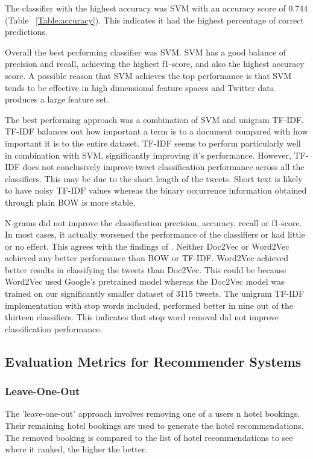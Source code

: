 The classifier with the highest accuracy was SVM with an accuracy score of 0.744 (Table ~\ref{Table:accuracy}). This indicates it had the highest percentage of correct predictions.

Overall the best performing classifier was SVM. SVM has a good balance of precision and recall, achieving the highest f1-score, and also the highest accuracy score. A possible reason that SVM achieves the top performance is that SVM tends to be effective in high dimensional feature spaces and Twitter data produces a large feature set.

The best performing approach was a combination of SVM and unigram TF-IDF. TF-IDF balances out how important a term is to a document compared with how important it is to the entire dataset. TF-IDF seems to perform particularly well in combination with SVM, significantly improving it's performance. However, TF-IDF does not conclusively improve tweet classification performance across all the classifiers. This may be due to the short length of the tweets. Short text is likely to have noisy TF-IDF values whereas the binary occurrence information obtained through plain BOW is more stable.

N-grams did not improve the classification precision, accuracy, recall or f1-score. In most cases, it actually worsened the performance of the classifiers or had little or no effect. This agrees with the findings of \cite{Berm2010}. Neither Doc2Vec or Word2Vec achieved any better performance than BOW or TF-IDF. Word2Vec achieved better results in classifying the tweets than Doc2Vec. This could be because Word2Vec used Google's pretrained model whereas the Doc2Vec model was trained on our significantly smaller dataset of 3115 tweets. The unigram TF-IDF implementation with stop words included, performed better in nine out of the thirteen classifiers. This indicates that stop word removal did not improve classification performance. 

\subsection{Evaluation Metrics for Recommender Systems}
\subsubsection{Leave-One-Out}
The 'leave-one-out' approach involves removing one of a users n hotel bookings. Their remaining hotel bookings are used to generate the hotel recommendations. The removed booking is compared to the list of hotel recommendations to see where it ranked, the higher the better. 

